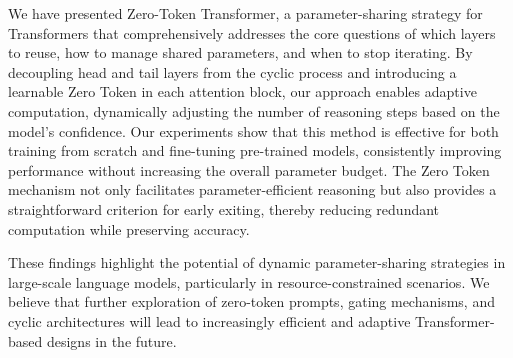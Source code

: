 

We have presented {Zero-Token Transformer}, a parameter-sharing strategy for Transformers that comprehensively addresses the core questions of {which} layers to reuse, {how} to manage shared parameters, and {when} to stop iterating. By decoupling head and tail layers from the cyclic process and introducing a learnable Zero Token in each attention block, our approach enables {adaptive computation}, dynamically adjusting the number of reasoning steps based on the model’s confidence.
Our experiments show that this method is effective for both {training from scratch} and {fine-tuning pre-trained models}, consistently improving performance without increasing the overall parameter budget. The Zero Token mechanism not only facilitates parameter-efficient reasoning but also provides a straightforward criterion for early exiting, thereby reducing redundant computation while preserving accuracy.

These findings highlight the potential of {dynamic parameter-sharing strategies} in large-scale language models, particularly in resource-constrained scenarios. We believe that further exploration of zero-token prompts, gating mechanisms, and cyclic architectures will lead to increasingly efficient and adaptive Transformer-based designs in the future.



